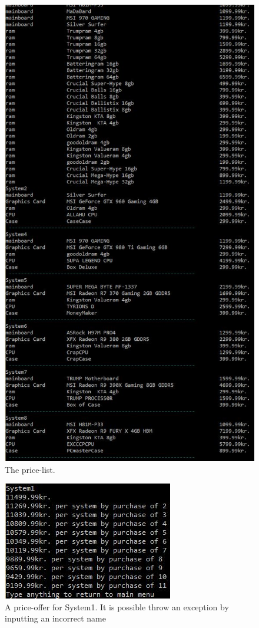 \documentclass[a4paper,10pt]{article}
\begin{document}
\begin{figure}[H]\center
	\includegraphics[scale=1]{Pricelisttest3.jpg}
	\caption{The price-list.}
\end{figure}

\begin{figure}[H]\center
	\includegraphics[scale=1]{Priceoffertest4.jpg}
	\caption{A price-offer for System1. It is possible throw an exception by inputting an incorrect name}
\end{figure}
\end{document}
